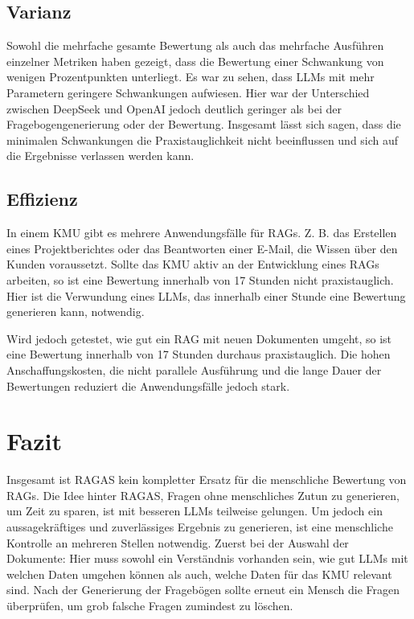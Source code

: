 \subsection{Varianz}

Sowohl die mehrfache gesamte Bewertung als auch das mehrfache Ausführen einzelner Metriken haben gezeigt, dass die Bewertung einer Schwankung von wenigen Prozentpunkten unterliegt.
Es war zu sehen, dass LLMs mit mehr Parametern geringere Schwankungen aufwiesen.
Hier war der Unterschied zwischen DeepSeek und OpenAI jedoch deutlich geringer als bei der Fragebogengenerierung oder der Bewertung.
Insgesamt lässt sich sagen, dass die minimalen Schwankungen die Praxistauglichkeit nicht beeinflussen und sich auf die Ergebnisse verlassen werden kann.

\subsection{Effizienz}
In einem KMU gibt es mehrere Anwendungsfälle für RAGs. Z. B. das Erstellen eines Projektberichtes oder das Beantworten einer E-Mail, die Wissen über den Kunden voraussetzt.
Sollte das KMU aktiv an der Entwicklung eines RAGs arbeiten, so ist eine Bewertung innerhalb von 17 Stunden nicht praxistauglich.
Hier ist die Verwundung eines LLMs, das innerhalb einer Stunde eine Bewertung generieren kann, notwendig.

Wird jedoch getestet, wie gut ein RAG mit neuen Dokumenten umgeht, so ist eine Bewertung innerhalb von 17 Stunden durchaus praxistauglich.
Die hohen Anschaffungskosten, die nicht parallele Ausführung und die lange Dauer der Bewertungen reduziert die Anwendungsfälle jedoch stark.


\section{Fazit}\label{sec:fazit}
Insgesamt ist RAGAS kein kompletter Ersatz für die menschliche Bewertung von RAGs. Die Idee hinter RAGAS, Fragen ohne menschliches Zutun zu generieren, um Zeit zu sparen, ist mit besseren LLMs teilweise gelungen.
Um jedoch ein aussagekräftiges und zuverlässiges Ergebnis zu generieren, ist eine menschliche Kontrolle an mehreren Stellen notwendig.
Zuerst bei der Auswahl der Dokumente: Hier muss sowohl ein Verständnis vorhanden sein, wie gut LLMs mit welchen Daten umgehen können als auch, welche Daten für das KMU relevant sind.
Nach der Generierung der Fragebögen sollte erneut ein Mensch die Fragen überprüfen, um grob falsche Fragen zumindest zu löschen.

